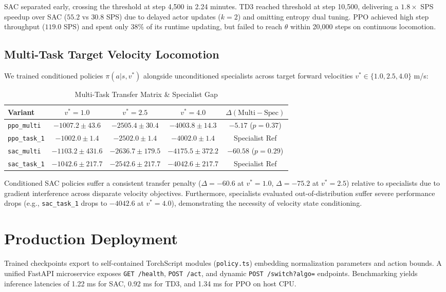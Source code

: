 \documentclass[10pt,journal,compsoc]{IEEEtran}
\begin{document}
SAC separated early, crossing the threshold at step 4,500 in 2.24 minutes. TD3 reached threshold at step 10,500, delivering a $1.8\times$ SPS speedup over SAC ($55.2$ vs $30.8$ SPS) due to delayed actor updates ($k=2$) and omitting entropy dual tuning. PPO achieved high step throughput ($119.0$ SPS) and spent only 38\% of its runtime updating, but failed to reach $\theta$ within 20,000 steps on continuous locomotion.

\subsection{Multi-Task Target Velocity Locomotion}
We trained conditioned policies $\pi(a|s, v^*)$ alongside unconditioned specialists across target forward velocities $v^* \in \{1.0, 2.5, 4.0\}$ m/s:

\begin{table}[htbp]
\caption{Multi-Task Transfer Matrix \& Specialist Gap}
\label{tab:multitask}
\centering
\begin{tabular}{lcccc}
\toprule
\textbf{Variant} & $v^*=1.0$ & $v^*=2.5$ & $v^*=4.0$ & $\Delta (\text{Multi} - \text{Spec})$ \\
\midrule
\texttt{ppo\_multi} & $-1007.2 \pm 43.6$ & $-2505.4 \pm 30.4$ & $-4003.8 \pm 14.3$ & $-5.17$ ($p=0.37$) \\
\texttt{ppo\_task\_1} & $\mathbf{-1002.0 \pm 1.4}$ & $-2502.0 \pm 1.4$ & $-4002.0 \pm 1.4$ & Specialist Ref \\
\texttt{sac\_multi} & $-1103.2 \pm 431.6$ & $-2636.7 \pm 179.5$ & $-4175.5 \pm 372.2$ & $\mathbf{-60.58}$ ($p=0.29$) \\
\texttt{sac\_task\_1} & $\mathbf{-1042.6 \pm 217.7}$ & $-2542.6 \pm 217.7$ & $-4042.6 \pm 217.7$ & Specialist Ref \\
\bottomrule
\end{tabular}
\end{table}

Conditioned SAC policies suffer a consistent transfer penalty ($\Delta = -60.6$ at $v^*=1.0$, $\Delta = -75.2$ at $v^*=2.5$) relative to specialists due to gradient interference across disparate velocity objectives. Furthermore, specialists evaluated out-of-distribution suffer severe performance drops (e.g., \texttt{sac\_task\_1} drops to $-4042.6$ at $v^*=4.0$), demonstrating the necessity of velocity state conditioning.

\section{Production Deployment}
Trained checkpoints export to self-contained TorchScript modules (\texttt{policy.ts}) embedding normalization parameters and action bounds. A unified FastAPI microservice exposes \texttt{GET /health}, \texttt{POST /act}, and dynamic \texttt{POST /switch?algo=} endpoints. Benchmarking yields inference latencies of 1.22 ms for SAC, 0.92 ms for TD3, and 1.34 ms for PPO on host CPU.
\end{document}
